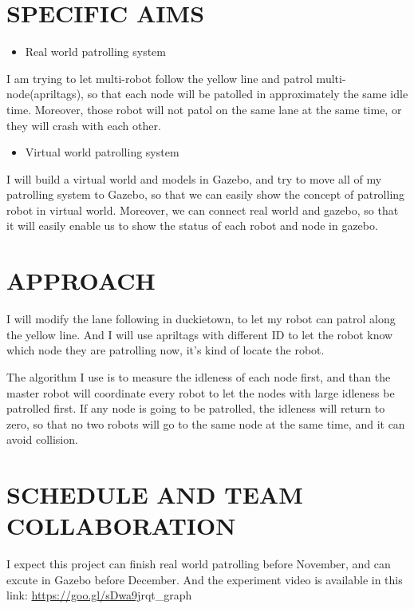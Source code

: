 \documentclass[letterpaper, 10 pt, conference]{ieeeconf}  %
\begin{document}
\section{SPECIFIC AIMS}

\begin{itemize}
\item Real world patrolling system
\end{itemize}
I am trying to let multi-robot follow the yellow line and patrol multi-node(apriltags), so that each node will be patolled in approximately the same idle time. Moreover, those robot will not patol on the same lane at the same time, or they will crash with each other.
\begin{itemize}
\item Virtual world patrolling system
\end{itemize}
I will build a virtual world and models in Gazebo, and try to move all of my patrolling system to Gazebo, so that we can easily show the concept of patrolling robot in virtual world. Moreover, we can connect real world and gazebo, so that it will easily enable us to show the status of each robot and node in gazebo.

\section{APPROACH}

I will modify the lane following in duckietown, to let my robot can patrol along the yellow line. And I will use apriltags with different ID to let the robot know which node they are patrolling now, it's kind of locate the robot.

The algorithm I use is to measure the idleness of each node first, and than the master robot will coordinate every robot to let the nodes with large idleness be patrolled first. If any node is going to be patrolled, the idleness will return to zero, so that no two robots will go to the same node at the same time, and it can avoid collision.   

\section{SCHEDULE AND TEAM COLLABORATION}

I expect this project can finish real world patrolling before November, and can excute in Gazebo before December. And the experiment video is available in this link: \url{https://goo.gl/sDwa9j}rqt\_graph~\cite{Farinelli:2017:DOD:3124264.3124274}

\addtolength{\textheight}{-12cm}   %



\end{document}
